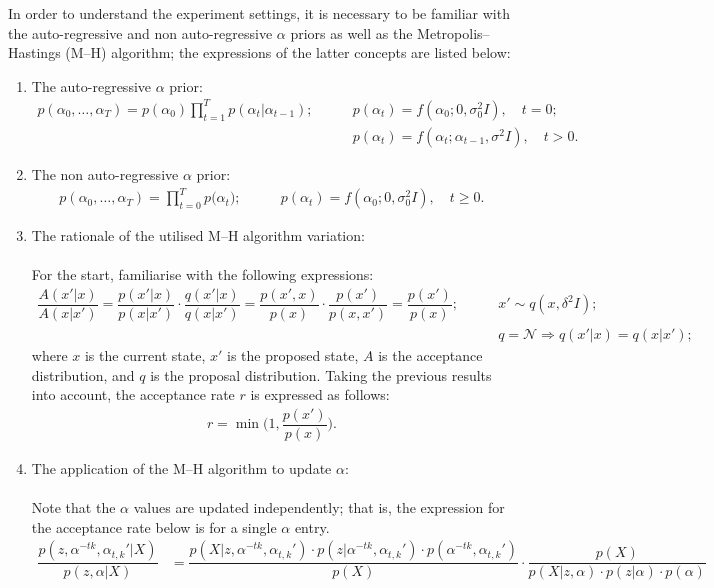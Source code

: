 \documentclass[12pt]{article}
\begin{document}
\par In order to understand the experiment settings, it is necessary to be familiar with the auto-regressive and non auto-regressive $\alpha$ priors as well as the Metropolis--Hastings (M--H) algorithm; the expressions of the latter concepts are listed below:
\begin{enumerate}
  \item The auto-regressive $\alpha$ prior:
    \begin{align*}
    p(\alpha_0,\ldots,\alpha_T)=p(\alpha_0)\prod_{t=1}^{T}{p(\alpha_t|\alpha_{t-1})}; \qquad &p(\alpha_t)=f(\alpha_0; 0, \sigma_0^2I), \quad t=0;\\
    & p(\alpha_t)=f(\alpha_t; \alpha_{t-1}, \sigma^2I), \quad t>0.
    \end{align*}
  \item The non auto-regressive $\alpha$ prior:
    \begin{align*}
    p(\alpha_0,\ldots,\alpha_T)=\prod_{t=0}^{T}{p(\alpha_t}); \qquad &p(\alpha_t)=f(\alpha_0; 0, \sigma_0^2I), \quad t \geq 0.
\end{align*}
  \item The rationale of the utilised M--H algorithm variation:\\\\
    For the start, familiarise with the following expressions:
    \begin{align*}
      \dfrac{A(x'|x)}{A(x|x')} = \dfrac{p(x'|x)}{p(x|x')}\cdot \dfrac{q(x'|x)}{q(x|x')} = \dfrac{p(x',x)}{p(x)}\cdot \dfrac{p(x')}{p(x,x')} = \dfrac{p(x')}{p(x)}; \qquad &x' \sim q(x,\delta^2I);\\
      & q = \mathcal{N} \Rightarrow q(x'|x) = q(x|x');
    \end{align*}
    where $x$ is the current state, $x'$ is the proposed state, $A$ is the acceptance distribution, and $q$ is the proposal distribution. Taking the previous results into account, the acceptance rate $r$ is expressed as follows:
    \begin{align*}
      r = \min{\bigg(1, \dfrac{p(x')}{p(x)}\bigg)}.
    \end{align*}
  \item The application of the M--H algorithm to update $\alpha$:\\\\
    Note that the $\alpha$ values are updated independently; that is, the expression for the acceptance rate below is for a single $\alpha$ entry.
    \begin{align*}
      \dfrac{p(z,\alpha^{-tk},\alpha_{t, k}'|X)}{p(z,\alpha|X)} &= \dfrac{p(X|z,\alpha^{-tk},\alpha_{t, k}')\cdot p(z|\alpha^{-tk},\alpha_{t, k}')\cdot p(\alpha^{-tk},\alpha_{t, k}')}{p(X)}\cdot \dfrac{p(X)}{p(X|z,\alpha)\cdot p(z|\alpha)\cdot p(\alpha)}\\

\end{align*}
\end{enumerate}
\end{document}
